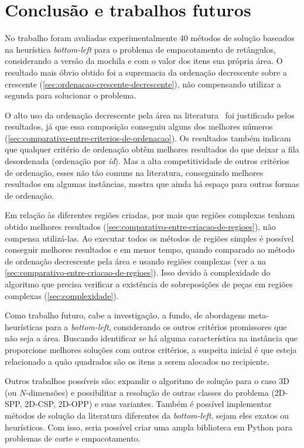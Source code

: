 \chapter*[Conclusão e trabalhos futuros]{Conclusão e trabalhos futuros}\label{ch:conclusao}

No trabalho foram avaliadas experimentalmente 40 métodos de solução baseados na heurística
\textit{bottom-left} para o problema de empacotamento de retângulos, considerando a versão da
mochila e com o valor dos itens sua própria área.
O resultado mais óbvio obtido foi a supremacia da ordenação decrescente sobre a crescente
(\cref{sec:ordenacao-crescente-decrescente}), não compensando utilizar a segunda para solucionar o
problema.

O alto uso da ordenação decrescente pela área na literatura~\cite{chen2019efficient} foi justificado
pelos resultados, já que essa composição conseguiu alguns dos melhores números
(\cref{sec:comparativo-entre-criterios-de-ordenacao}).
Os resultados também indicam que qualquer critério de ordenação obtêm melhores resultados do que
deixar a fila desordenada (ordenação por \textit{id}).
Mas a alta competitividade de outros critérios de ordenação, esses não tão comuns na literatura,
conseguindo melhores resultados em algumas instâncias, mostra que ainda há espaço para outras
formas de ordenação.

Em relação às diferentes regiões criadas, por mais que regiões complexas tenham obtido melhores
resultados (\cref{sec:comparativo-entre-criacao-de-regioes}), não compensa utilizá-las.
Ao executar todos os métodos de regiões simples é possível conseguir melhores resultados e em menor
tempo, quando comparado ao método de ordenação decrescente pela área e usando regiões complexas
(ver a  na \cref{sec:comparativo-entre-criacao-de-regioes}).
Isso devido à complexidade do algoritmo que precisa verificar a existência de sobreposições de peças
em regiões complexas (\cref{sec:complexidade}).

Como trabalho futuro, cabe a investigação, a fundo, de abordagens meta-heurísticas para a
\textit{bottom-left}, considerando os outros critérios promissores que não seja a área.
Buscando identificar se há alguma característica na instância que proporcione melhores soluções com
outros critérios, a suspeita inicial é que esteja relacionado a quão quadrados são os itens a serem
alocados no recipiente.

Outros trabalhos possíveis são: expandir o algoritmo de solução para o caso 3D (ou $N$-dimensões) e
possibilitar a resolução de outras classes do problema (2D-SPP, 2D-CSP, 2D-OPP) e suas variantes.
Também é possível implementar métodos de solução da literatura diferentes da \textit{bottom-left},
sejam eles exatos ou heurísticos.
Com isso, seria possível criar uma ampla biblioteca em Python para problemas de corte e empacotamento.

